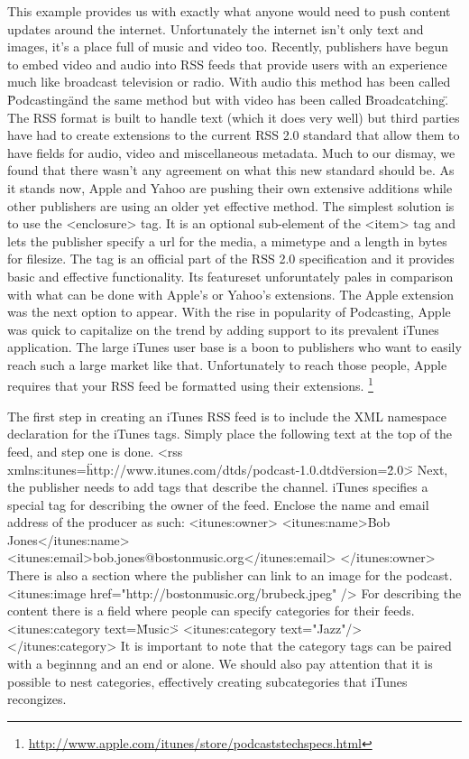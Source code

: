 \documentclass[a4paper,12pt]{report}
\begin{document}
This example provides us with exactly what anyone would need to push content updates around the internet.
Unfortunately the internet isn't only text and images, it's a place full of music and video too.
Recently, publishers have begun to embed video and audio into RSS feeds that provide users with an experience much like broadcast television or radio.
With audio this method has been called \"Podcasting\" and the same method but with video has been called \"Broadcatching\".
The RSS format is built to handle text (which it does very well) but third parties have had to create extensions to the current RSS 2.0 standard that allow them to have fields for audio, video and miscellaneous metadata.
Much to our dismay, we found that there wasn't any agreement on what this new standard should be.
As it stands now, Apple and Yahoo are pushing their own extensive additions while other publishers are using an older yet effective method.
The simplest solution is to use the <enclosure> tag.
It is an optional sub-element of the <item> tag and lets the publisher specify a url for the media, a mimetype and a length in bytes for filesize.
The tag is an official part of the RSS 2.0 specification and it provides basic and effective functionality.
Its featureset unforuntately pales in comparison with what can be done with Apple's or Yahoo's extensions.
The Apple extension was the next option to appear.
With the rise in popularity of Podcasting, Apple was quick to capitalize on the trend by adding support to its prevalent iTunes application.
The large iTunes user base is a boon to publishers who want to easily reach such a large market like that.
Unfortunately to reach those people, Apple requires that your RSS feed be formatted using their extensions. \footnote{\url{http://www.apple.com/itunes/store/podcaststechspecs.html}}

The first step in creating an iTunes RSS feed is to include the XML namespace declaration for the iTunes tags.
Simply place the following text at the top of the feed, and step one is done.
<rss xmlns:itunes=\"http://www.itunes.com/dtds/podcast-1.0.dtd\" version=\"2.0\">
Next, the publisher needs to add tags that describe the channel.
iTunes specifies a special tag for describing the owner of the feed.
Enclose the name and email address of the producer as such:
  <itunes:owner>
    <itunes:name>Bob Jones</itunes:name>
    <itunes:email>bob.jones@bostonmusic.org</itunes:email>
  </itunes:owner>
There is also a section where the publisher can link to an image for the podcast.
   <itunes:image href="http://bostonmusic.org/brubeck.jpeg" />
For describing the content there is a field where people can specify categories for their feeds.
	<itunes:category text=\"Music\">
      <itunes:category text="Jazz"/>
   </itunes:category>
It is important to note that the category tags can be paired with a beginnng and an end or alone.
We should also pay attention that it is possible to nest categories, effectively creating subcategories that iTunes recongizes.
\end{document}

